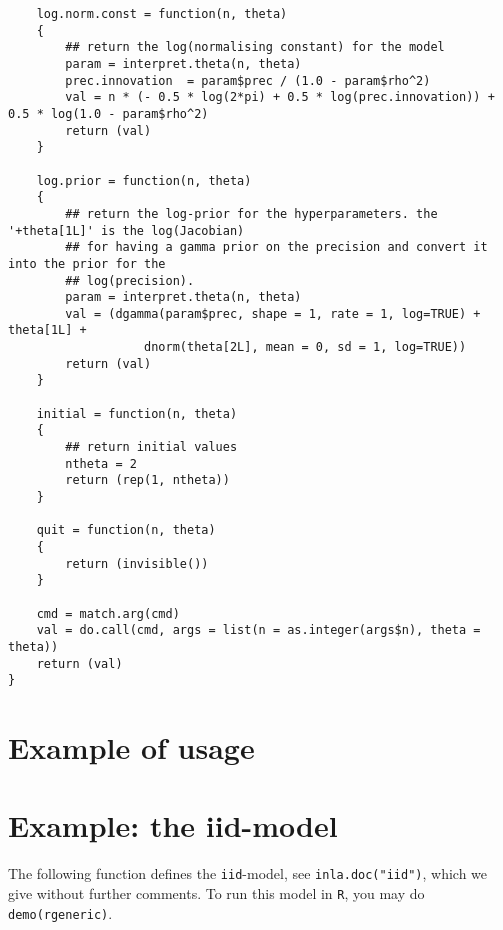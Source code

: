 \documentclass[a4paper,11pt]{article}
\begin{document}
{\begin{verbatim}
    log.norm.const = function(n, theta)
    {
        ## return the log(normalising constant) for the model
        param = interpret.theta(n, theta)
        prec.innovation  = param$prec / (1.0 - param$rho^2)
        val = n * (- 0.5 * log(2*pi) + 0.5 * log(prec.innovation)) + 0.5 * log(1.0 - param$rho^2)
        return (val)
    }

    log.prior = function(n, theta)
    {
        ## return the log-prior for the hyperparameters. the '+theta[1L]' is the log(Jacobian)
        ## for having a gamma prior on the precision and convert it into the prior for the
        ## log(precision).
        param = interpret.theta(n, theta)
        val = (dgamma(param$prec, shape = 1, rate = 1, log=TRUE) + theta[1L] + 
                   dnorm(theta[2L], mean = 0, sd = 1, log=TRUE))
        return (val)
    }

    initial = function(n, theta)
    {
        ## return initial values
        ntheta = 2
        return (rep(1, ntheta))
    }

    quit = function(n, theta)
    {
        return (invisible())
    }

    cmd = match.arg(cmd)
    val = do.call(cmd, args = list(n = as.integer(args$n), theta = theta))
    return (val)
}
\end{verbatim}
}

\section*{Example of usage}

{\small

}

\section*{Example: the iid-model}

The following function defines the \texttt{iid}-model, see
\texttt{inla.doc("iid")}, which we give without further comments. To
run this model in \texttt{R}, you may do \texttt{demo(rgeneric)}.
\end{document}
